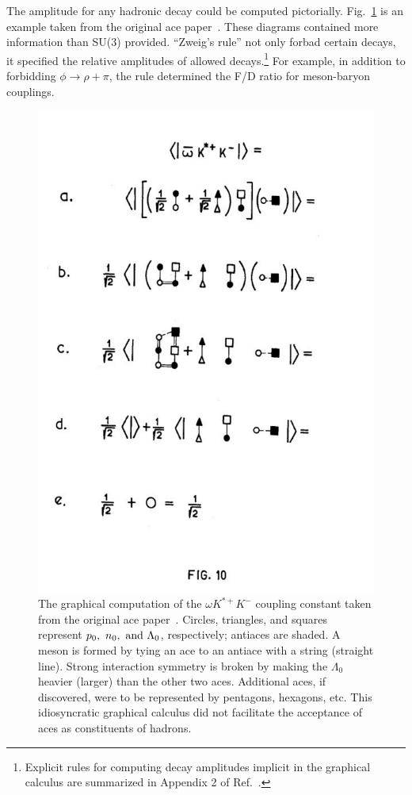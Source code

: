 \documentclass[12pt]{article}
\begin{document}
The amplitude for any hadronic decay could be computed pictorially. Fig.~\ref{fig:aceFig10} is an example taken from the original ace paper~\cite{GZaces2}. These diagrams contained more information than SU(3) provided. ``Zweig's rule'' not only forbad certain decays, it specified the relative amplitudes of allowed decays.\footnote{Explicit rules for computing decay amplitudes implicit in the graphical calculus are summarized in Appendix 2 of Ref.~\cite{MWZpatterns}.} For example, in addition to forbidding $\phi\to\rho+\pi$, the rule determined the F/D ratio for meson-baryon couplings.
\begin{figure}
   \centering
   \includegraphics [scale=.5] {aceFig10A}
   \caption{The graphical computation of the $\omega K^{*+} K^{-}$ coupling constant taken from the original ace paper~\cite{GZaces2}. Circles, triangles, and squares represent $p_0,\ n_0,\ {\rm and}\ \Lambda_0$, respectively; antiaces are shaded. A meson is formed by tying an ace to an antiace with a string (straight line). Strong interaction symmetry is broken by making the $\Lambda_0$ heavier (larger) than the other two aces. Additional aces, if discovered, were to be represented by pentagons, hexagons, etc. This idiosyncratic graphical calculus did not facilitate the acceptance of aces as constituents of hadrons.}
   \label{fig:aceFig10}
\end{figure}
\end{document}
